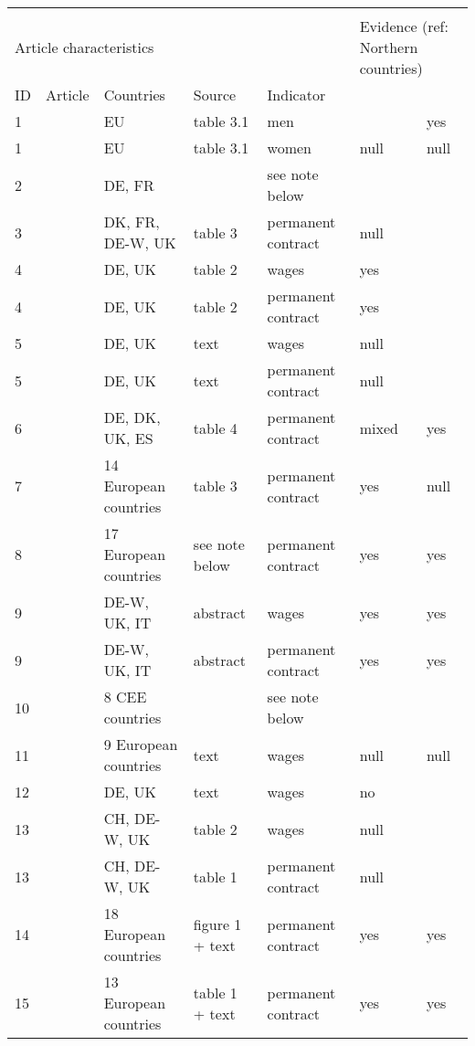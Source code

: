 \begin{tabular}{lllll>{\raggedright\arraybackslash}p{1.2in}>{\raggedright\arraybackslash}p{1.2in}}
   \\[-1.8ex]\hline\hline \\ 
 [-1.8ex] \multicolumn{5}{l}{Article characteristics} 
& \multicolumn{2}{l}{Evidence (ref: Northern countries)}
\\ 

            \cmidrule(lr){1-5} 
            \cmidrule(lr){6-7} ID 
& Article 
& Countries
& Source
& Indicator 
& \multicolumn{1}{>{\raggedright\arraybackslash}p{1.2in}}{Continental disadvantage}
& \multicolumn{1}{>{\raggedright\arraybackslash}p{1.2in}}{Southern disadvantage}
             \\ 
 \hline
1 & \citealp{debels_2008} & EU & table 3.1 & men &  & yes \\ 
  1 & \citealp{debels_2008} & EU & table 3.1 & women & null & null \\ 
  2 & \citealp{gash_mcginnity_2007} & DE, FR &  & see note below &  &  \\ 
  3 & \citealp{gash_2008} & DK, FR, DE-W, UK & table 3 & permanent contract & null &  \\ 
  4 & \citealp{gebel_2010} & DE, UK & table 2 & wages & yes &  \\ 
  4 & \citealp{gebel_2010} & DE, UK & table 2 & permanent contract & yes &  \\ 
  5 & \citealp{giesecke_gross_2004} & DE, UK & text & wages & null &  \\ 
  5 & \citealp{giesecke_gross_2004} & DE, UK & text & permanent contract & null &  \\ 
  6 & \citealp{leschke_2009} & DE, DK, UK, ES & table 4 & permanent contract & mixed & yes \\ 
  7 & \citealp{muffels_luijkx_2008} & 14 European countries & table 3 & permanent contract & yes & null \\ 
  8 & \citealp{passaretta_wolbers_2019} & 17 European countries & see note below & permanent contract & yes & yes \\ 
  9 & \citealp{scherer_2004} & DE-W, UK, IT & abstract & wages & yes & yes \\ 
  9 & \citealp{scherer_2004} & DE-W, UK, IT & abstract & permanent contract & yes & yes \\ 
  10 & \citealp{babos_2014} & 8 CEE countries &  & see note below &  &  \\ 
  11 & \citealp{comi_grasseni_2012} & 9 European countries & text & wages & null & null \\ 
  12 & \citealp{pavlopoulos_2013} & DE, UK & text & wages & no &  \\ 
  13 & \citealp{gebel_2013} & CH, DE-W, UK & table 2 & wages & null &  \\ 
  13 & \citealp{gebel_2013} & CH, DE-W, UK & table 1 & permanent contract & null &  \\ 
  14 & \citealp{hogberg_etal_2019} & 18 European countries & figure 1 + text & permanent contract & yes & yes \\ 
  15 & \citealp{barbieri_cutuli_2016} & 13 European countries & table 1 + text & permanent contract & yes & yes \\ 
   \hline 
\end{tabular}
